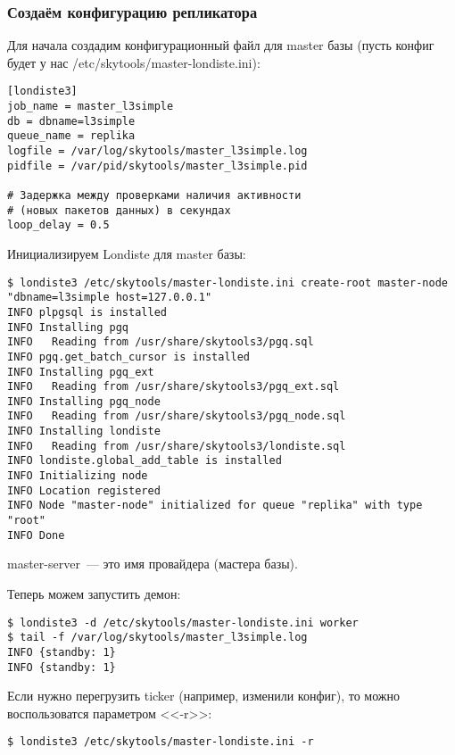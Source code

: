 \subsubsection{Создаём конфигурацию репликатора}
Для начала создадим конфигурационный файл для master базы
(пусть конфиг будет у нас /etc/skytools/master-londiste.ini):
\begin{lstlisting}[label=lst:londiste-replica1,caption=Создаём конфигурацию репликатора]
[londiste3]
job_name = master_l3simple
db = dbname=l3simple
queue_name = replika
logfile = /var/log/skytools/master_l3simple.log
pidfile = /var/pid/skytools/master_l3simple.pid

# Задержка между проверками наличия активности
# (новых пакетов данных) в секундах
loop_delay = 0.5
\end{lstlisting}

Инициализируем Londiste для master базы:

\begin{lstlisting}[label=lst:londiste-replica2,caption=Инициализируем Londiste]
$ londiste3 /etc/skytools/master-londiste.ini create-root master-node "dbname=l3simple host=127.0.0.1"
INFO plpgsql is installed
INFO Installing pgq
INFO   Reading from /usr/share/skytools3/pgq.sql
INFO pgq.get_batch_cursor is installed
INFO Installing pgq_ext
INFO   Reading from /usr/share/skytools3/pgq_ext.sql
INFO Installing pgq_node
INFO   Reading from /usr/share/skytools3/pgq_node.sql
INFO Installing londiste
INFO   Reading from /usr/share/skytools3/londiste.sql
INFO londiste.global_add_table is installed
INFO Initializing node
INFO Location registered
INFO Node "master-node" initialized for queue "replika" with type "root"
INFO Done
\end{lstlisting}

master-server~--- это имя провайдера (мастера базы).

Теперь можем запустить демон:

\begin{lstlisting}[label=lst:londiste-replica3,caption=Запускаем демон для master базы]
$ londiste3 -d /etc/skytools/master-londiste.ini worker
$ tail -f /var/log/skytools/master_l3simple.log
INFO {standby: 1}
INFO {standby: 1}
\end{lstlisting}

Если нужно перегрузить ticker (например, изменили конфиг), то можно воспользоватся параметром <<-r>>:

\begin{lstlisting}[label=lst:londiste-replica4,caption=Перегрузка ticker]
$ londiste3 /etc/skytools/master-londiste.ini -r
\end{lstlisting}

